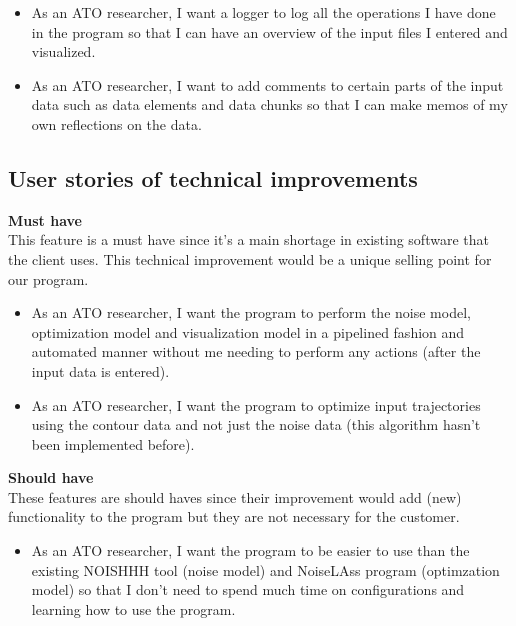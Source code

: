 \begin{itemize}
\item As an ATO researcher, I want a logger to log all the operations I have done in the program so that I can have an overview of the input files I entered and visualized. 
\item As an ATO researcher, I want to add comments to certain parts of the input data such as data elements and data chunks so that I can make memos of my own reflections on the data.
\end{itemize}

\newpage
\subsection{User stories of technical improvements}
\textbf{Must have} \\
This feature is a must have since it's a main shortage in existing software that the client uses. This technical improvement would be a unique selling point for our program. 
\begin{itemize}
\item As an ATO researcher, I want the program to perform the noise model, optimization model and visualization model in a pipelined fashion and automated manner without me needing to perform any actions (after the input data is entered).
\item As an ATO researcher, I want the program to optimize input trajectories using the contour data and not just the noise data (this algorithm hasn't been implemented before).
\end{itemize}

\textbf{Should have} \\
These features are should haves since their improvement would add (new) functionality to the program but they are not necessary for the customer. 
\begin{itemize}
\item As an ATO researcher, I want the program to be easier to use than the existing NOISHHH tool (noise model) and NoiseLAss program (optimzation model) so that I don't need to spend much time on configurations and learning how to use the program.
\end{itemize}


